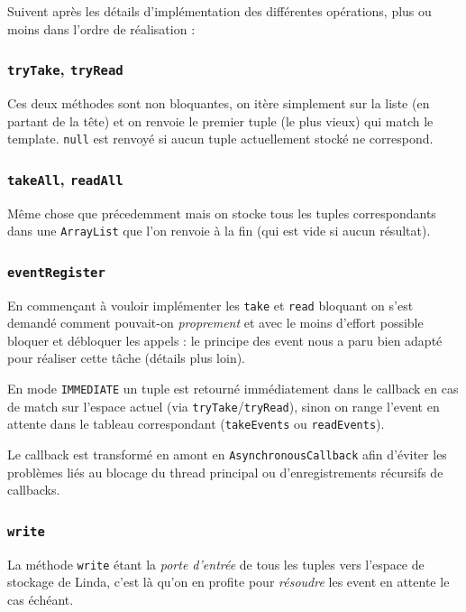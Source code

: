 \documentclass[headings=standardclasses,parskip=half]{scrartcl}
\begin{document}
Suivent après les détails d'implémentation des différentes opérations,
plus ou moins dans l'ordre de réalisation :

\subsubsection{\texttt{tryTake}, \texttt{tryRead}}

Ces deux méthodes sont non bloquantes, on itère simplement sur la liste
(en partant de la tête) et on renvoie le premier tuple (le plus vieux)
qui match le template. \texttt{null} est renvoyé si aucun tuple
actuellement stocké ne correspond.

\subsubsection{\texttt{takeAll}, \texttt{readAll}}

Même chose que précedemment mais on stocke tous les tuples correspondants
dans une \texttt{ArrayList} que l'on renvoie à la fin (qui est vide
si aucun résultat).

\subsubsection{\texttt{eventRegister}}

En commençant à vouloir implémenter les \texttt{take} et \texttt{read}
bloquant on s'est demandé comment pouvait-on \textit{proprement} et avec le
moins d'effort possible bloquer et débloquer les appels : le principe
des event nous a paru bien adapté pour réaliser cette tâche
(détails plus loin).

En mode \texttt{IMMEDIATE} un tuple est retourné immédiatement dans
le callback en cas de match sur l'espace actuel
(via \texttt{tryTake}/\texttt{tryRead}),
sinon on range l'event en attente dans le tableau correspondant
(\texttt{takeEvents} ou \texttt{readEvents}).

Le callback est transformé en amont en \texttt{AsynchronousCallback}
afin d'éviter les problèmes liés au blocage du thread principal ou
d'enregistrements récursifs de callbacks.

\subsubsection{\texttt{write}}

La méthode \texttt{write} étant la \textit{porte d'entrée} de tous les tuples
vers l'espace de stockage de Linda, c'est là qu'on en profite pour
\textit{résoudre} les event en attente le cas échéant.
\end{document}
